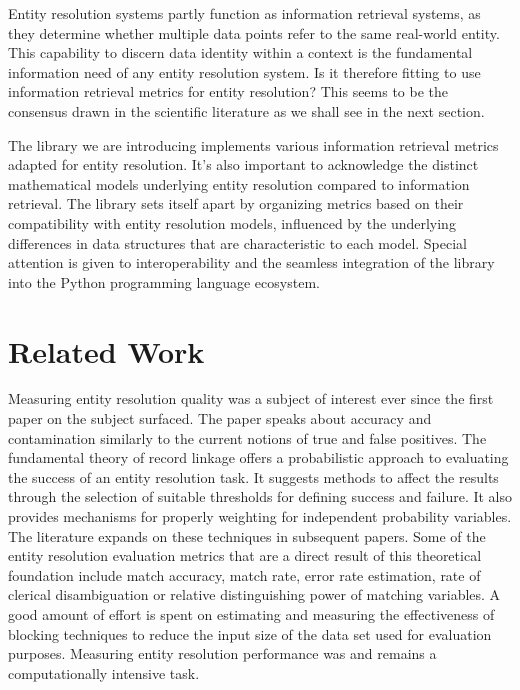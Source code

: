 \documentclass[11pt]{article}
\begin{document}
    Entity resolution systems partly function as information retrieval systems,
    as they determine whether multiple data points refer to the same real-world
    entity.
    This capability to discern data identity within a context is the fundamental
    information need of any entity resolution system.
    Is it therefore fitting to use information retrieval metrics for entity
    resolution?
    This seems to be the consensus drawn in the scientific literature as we
    shall see in the next section.

    The library we are introducing implements various information retrieval
    metrics adapted for entity resolution.
    It's also important to acknowledge the distinct mathematical models
    underlying entity resolution compared to information retrieval.
    The library sets itself apart by organizing metrics based on their
    compatibility with entity resolution models, influenced by the underlying
    differences in data structures that are characteristic to each model.
    Special attention is given to interoperability and the seamless integration
    of the library into the Python programming language ecosystem.

    \section{Related Work}\label{sec:related}

    Measuring entity resolution quality was a subject of interest ever since the
    first paper on the subject surfaced\cite{newcombe1959}.
    The paper speaks about accuracy and contamination similarly to the current
    notions of true and false positives.
    The fundamental theory of record linkage\cite{fs1969} offers a probabilistic
    approach to evaluating the success of an entity resolution task.
    It suggests methods to affect the results through the selection of suitable
    thresholds for defining success and failure.
    It also provides mechanisms for properly weighting for independent
    probability variables.
    The literature expands on these techniques in subsequent
    papers\cite{winkler1990}.
    Some of the entity resolution evaluation metrics that are a direct result of
    this theoretical foundation include match accuracy, match
    rate\cite{jaro1989advances}, error rate estimation, rate of clerical
    disambiguation\cite{winkler1990} or relative distinguishing
    power of matching variables\cite{winkler2014}.
    A good amount of effort is spent on estimating and measuring the
    effectiveness of blocking techniques to reduce the input size of the data
    set used for evaluation purposes\cite{winkler1990,jaro1989advances}.
    Measuring entity resolution performance was and remains a computationally
    intensive task.
    
\end{document}
